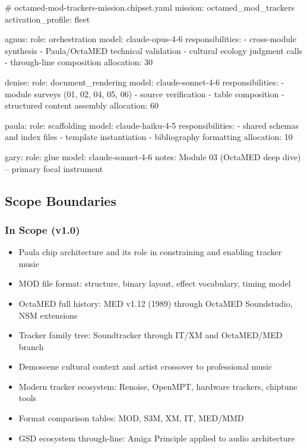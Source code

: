 \documentclass[11pt,letterpaper]{article}
\begin{document}
\begin{asciibox}
# octamed-mod-trackers-mission.chipset.yaml
mission: octamed_mod_trackers
activation_profile: fleet

agnus:
  role: orchestration
  model: claude-opus-4-6
  responsibilities:
    - cross-module synthesis
    - Paula/OctaMED technical validation
    - cultural ecology judgment calls
    - through-line composition
  allocation: 30%

denise:
  role: document_rendering
  model: claude-sonnet-4-6
  responsibilities:
    - module surveys (01, 02, 04, 05, 06)
    - source verification
    - table composition
    - structured content assembly
  allocation: 60%

paula:
  role: scaffolding
  model: claude-haiku-4-5
  responsibilities:
    - shared schemas and index files
    - template instantiation
    - bibliography formatting
  allocation: 10%

gary:
  role: glue
  model: claude-sonnet-4-6
  notes: Module 03 (OctaMED deep dive) -- primary focal instrument
\end{asciibox}

\subsection{Scope Boundaries}

\subsubsection{In Scope (v1.0)}
\begin{itemize}[leftmargin=1.5em]
  \item Paula chip architecture and its role in constraining and enabling tracker music
  \item MOD file format: structure, binary layout, effect vocabulary, timing model
  \item OctaMED full history: MED v1.12 (1989) through OctaMED Soundstudio, NSM extensions
  \item Tracker family tree: Soundtracker through IT/XM and OctaMED/MED branch
  \item Demoscene cultural context and artist crossover to professional music
  \item Modern tracker ecosystem: Renoise, OpenMPT, hardware trackers, chiptune tools
  \item Format comparison tables: MOD, S3M, XM, IT, MED/MMD
  \item GSD ecosystem through-line: Amiga Principle applied to audio architecture
\end{itemize}
\end{document}
